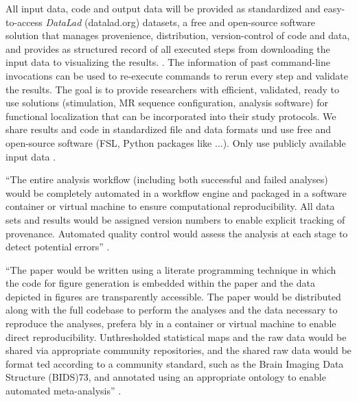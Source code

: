 All input data, code and output data will be provided as standardized and
easy-to-access \textit{DataLad} (datalad.org) datasets, a free and open-source software
solution that manages provenience, distribution, version-control of code and
data, and provides as structured record of all executed steps from downloading
the input data to visualizing the results.
\citep{halchenko2021datalad}. The information of past command-line invocations
can be used to re-execute commands to rerun every step and validate the results.
%
The goal is to provide researchers with efficient, validated, ready to use
solutions (stimulation, MR sequence configuration, analysis software) for
functional localization that can be incorporated into their study protocols.
%
We share results and code in standardized file and data formats und use free and
open-source software (FSL, Python packages like ...). Only use publicly
available input data \citep{eglen2017toward}.

``The entire analysis workflow (including both successful and failed analyses)
would be completely automated in a workflow engine and packaged in a software
container or virtual machine to ensure computational reproducibility. All data
sets and results would be assigned version numbers to enable explicit tracking
of provenance. Automated quality control would assess the analysis at each stage
to detect potential errors'' \citep{poldrack2017scanning}.

``The paper would be written using a literate programming technique in which the
code for figure generation is embedded within the paper and the data depicted in
figures are transparently accessible. The paper would be distributed along with
the full codebase to perform the analyses and the data necessary to reproduce
the analyses, prefera­ bly in a container or virtual machine to enable direct
reproducibility. Unthresholded statistical maps and the raw data would be shared
via appropriate community repositories, and the shared raw data would be format­
ted according to a community standard, such as the Brain Imaging Data Structure
(BIDS)73, and annotated using an appropriate ontology to enable automated
meta-analysis'' \citep{poldrack2017scanning}.

